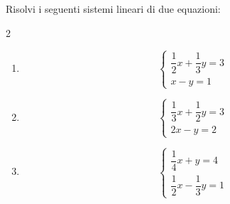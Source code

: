 
\begin{question}[ID=2.1, subtitle={Sistemi con coefficienti frazionari}, difficulty=facile, tags={sistemi, equazioni lineari, frazioni}]
Risolvi i seguenti sistemi lineari di due equazioni:
\begin{multicols}{2}
\begin{enumerate}[leftmargin=3.2cm]
    \item
    \[
    \begin{cases}
    \dfrac{1}{2}x+\dfrac{1}{3}y=3\\
    x-y=1
    \end{cases}
    \]

    \item
    \[
    \begin{cases}
    \dfrac{1}{3}x+\dfrac{1}{2}y=3\\
    2x-y=2
    \end{cases}
    \]

    \item
    \[
    \begin{cases}
    \dfrac{1}{4}x+y=4\\
    \dfrac{1}{2}x-\dfrac{1}{3}y=1
    \end{cases}
    \]


\end{enumerate}
\end{multicols}
\end{question}
